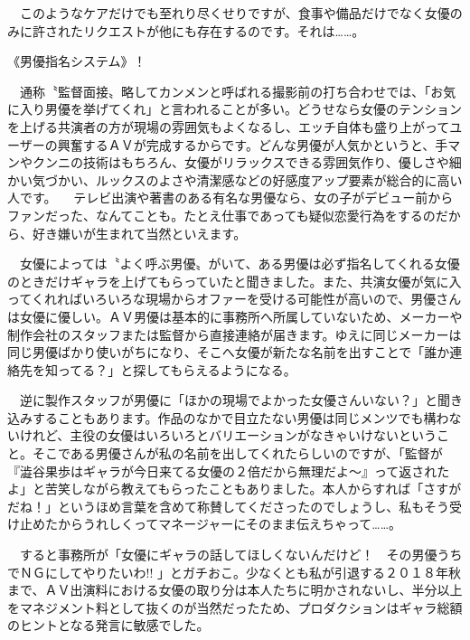 \documentclass[12pt,UTF8]{ctexbook}
\begin{document}
　このようなケアだけでも至れり尽くせりですが、食事や備品だけでなく女優のみに許されたリクエストが他にも存在するのです。それは……。

《男優指名システム》！

　通称〝監督面接〟略してカンメンと呼ばれる撮影前の打ち合わせでは、「お気に入り男優を挙げてくれ」と言われることが多い。どうせなら女優のテンションを上げる共演者の方が現場の雰囲気もよくなるし、エッチ自体も盛り上がってユーザーの興奮するＡＶが完成するからです。どんな男優が人気かというと、手マンやクンニの技術はもちろん、女優がリラックスできる雰囲気作り、優しさや細かい気づかい、ルックスのよさや清潔感などの好感度アップ要素が総合的に高い人です。
　テレビ出演や著書のある有名な男優なら、女の子がデビュー前からファンだった、なんてことも。たとえ仕事であっても疑似恋愛行為をするのだから、好き嫌いが生まれて当然といえます。

　女優によっては〝よく呼ぶ男優〟がいて、ある男優は必ず指名してくれる女優のときだけギャラを上げてもらっていたと聞きました。また、共演女優が気に入ってくれればいろいろな現場からオファーを受ける可能性が高いので、男優さんは女優に優しい。ＡＶ男優は基本的に事務所へ所属していないため、メーカーや制作会社のスタッフまたは監督から直接連絡が届きます。ゆえに同じメーカーは同じ男優ばかり使いがちになり、そこへ女優が新たな名前を出すことで「誰か連絡先を知ってる？」と探してもらえるようになる。

　逆に製作スタッフが男優に「ほかの現場でよかった女優さんいない？」と聞き込みすることもあります。作品のなかで目立たない男優は同じメンツでも構わないけれど、主役の女優はいろいろとバリエーションがなきゃいけないということ。そこである男優さんが私の名前を出してくれたらしいのですが、「監督が『澁谷果歩はギャラが今日来てる女優の２倍だから無理だよ〜』って返されたよ」と苦笑しながら教えてもらったこともありました。本人からすれば「さすがだね！」というほめ言葉を含めて称賛してくださったのでしょうし、私もそう受け止めたからうれしくってマネージャーにそのまま伝えちゃって……。

　すると事務所が「女優にギャラの話してほしくないんだけど！　その男優うちでＮＧにしてやりたいわ!!
 」とガチおこ。少なくとも私が引退する２０１８年秋まで、ＡＶ出演料における女優の取り分は本人たちに明かされないし、半分以上をマネジメント料として抜くのが当然だったため、プロダクションはギャラ総額のヒントとなる発言に敏感でした。
\end{document}
